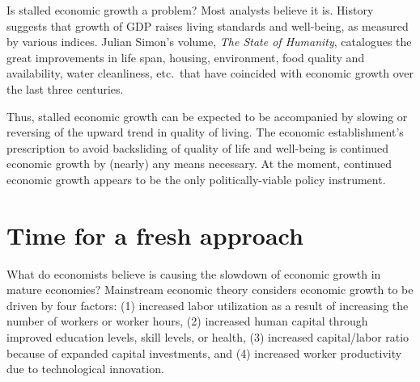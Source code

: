 Is stalled economic growth a problem? 
Most analysts believe it is. 
History suggests that growth of GDP 
raises living standards and well-being,
as measured by various indices. 
Julian Simon's volume, \emph{The State of Humanity}, 
catalogues the great improvements in 
life span, 
housing, 
environment, 
food quality and availability, 
water cleanliness, 
etc.\ 
that have coincided with 
economic growth over the last three centuries.\cite{simon1996} 

Thus, stalled economic growth can be expected 
to be accompanied by slowing or reversing
of the upward trend in quality of living. 
The economic establishment's prescription
to avoid backsliding of quality of life and well-being
is continued economic growth by (nearly) any means necessary. 
At the moment, continued economic growth appears to be the only 
politically-viable policy instrument.



\section{Time for a fresh approach}
\label{sec:fresh_approach}

What do economists believe is causing the slowdown
of economic growth in mature economies? 
Mainstream economic theory considers 
economic growth to be driven by four factors: 
(1) increased labor utilization as a result of increasing the number of workers or worker hours, 
(2) increased human capital through improved education levels, skill levels, or health, 
(3) increased capital/labor ratio because of expanded capital investments, and 
(4) increased worker productivity due to technological innovation. 


